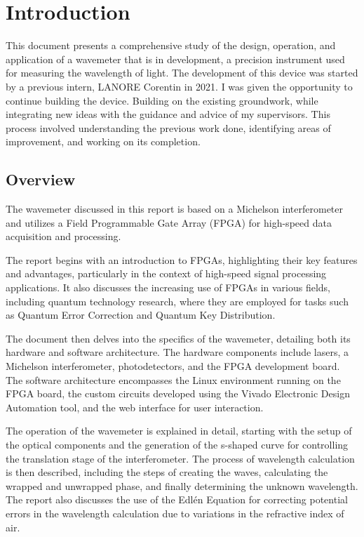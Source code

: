 \documentclass[12pt, twoside]{report}
\begin{document}
\tableofcontents


\pagestyle{plain}

\chapter{Introduction}\label{chp:intro}

This document presents a comprehensive study of the design, operation, and application of a wavemeter that is in development, a precision instrument used for measuring the wavelength of light. The development of this device was started by a previous intern, LANORE Corentin in 2021. I was given the opportunity to continue building the device. Building on the existing groundwork, while integrating new ideas with the guidance and advice of my supervisors. This process involved understanding the previous work done, identifying areas of improvement, and working on its completion.

\section{Overview}
The wavemeter discussed in this report is based on a Michelson interferometer and utilizes a Field Programmable Gate Array (FPGA) for high-speed data acquisition and processing.

\vspace{1em}
The report begins with an introduction to FPGAs, highlighting their key features and advantages, particularly in the context of high-speed signal processing applications. It also discusses the increasing use of FPGAs in various fields, including quantum technology research, where they are employed for tasks such as Quantum Error Correction and Quantum Key Distribution.

\vspace{1em}
The document then delves into the specifics of the wavemeter, detailing both its hardware and software architecture. The hardware components include lasers, a Michelson interferometer, photodetectors, and the FPGA development board. The software architecture encompasses the Linux environment running on the FPGA board, the custom circuits developed using the Vivado Electronic Design Automation tool, and the web interface for user interaction.

\vspace{1em}
The operation of the wavemeter is explained in detail, starting with the setup of the optical components and the generation of the s-shaped curve for controlling the translation stage of the interferometer. The process of wavelength calculation is then described, including the steps of creating the waves, calculating the wrapped and unwrapped phase, and finally determining the unknown wavelength. The report also discusses the use of the Edlén Equation for correcting potential errors in the wavelength calculation due to variations in the refractive index of air.
\end{document}
